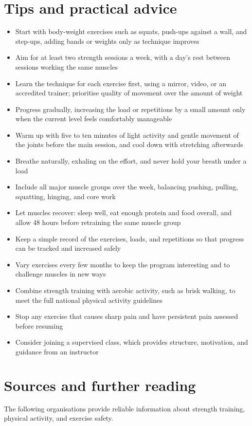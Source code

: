\section*{Tips and practical advice}
\begin{itemize}
    \item Start with body-weight exercises such as squats, push-ups against a wall, and step-ups, adding bands or weights only as technique improves
    \item Aim for at least two strength sessions a week, with a day's rest between sessions working the same muscles
    \item Learn the technique for each exercise first, using a mirror, video, or an accredited trainer; prioritise quality of movement over the amount of weight
    \item Progress gradually, increasing the load or repetitions by a small amount only when the current level feels comfortably manageable
    \item Warm up with five to ten minutes of light activity and gentle movement of the joints before the main session, and cool down with stretching afterwards
    \item Breathe naturally, exhaling on the effort, and never hold your breath under a load
    \item Include all major muscle groups over the week, balancing pushing, pulling, squatting, hinging, and core work
    \item Let muscles recover: sleep well, eat enough protein and food overall, and allow 48 hours before retraining the same muscle group
    \item Keep a simple record of the exercises, loads, and repetitions so that progress can be tracked and increased safely
    \item Vary exercises every few months to keep the program interesting and to challenge muscles in new ways
    \item Combine strength training with aerobic activity, such as brisk walking, to meet the full national physical activity guidelines
    \item Stop any exercise that causes sharp pain and have persistent pain assessed before resuming
    \item Consider joining a supervised class, which provides structure, motivation, and guidance from an instructor
\end{itemize}

\section*{Sources and further reading}
The following organisations provide reliable information about strength training, physical activity, and exercise safety.

